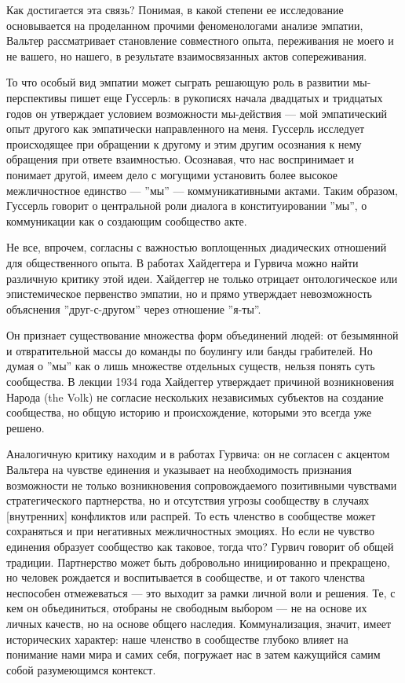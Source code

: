 \documentclass[11pt]{book}
\begin{document}
Как достигается эта связь? Понимая, в какой степени ее исследование основывается на проделанном прочими феноменологами анализе эмпатии, Вальтер рассматривает становление совместного опыта, переживания не моего и не вашего, но нашего, в результате взаимосвязанных актов сопереживания.

То что особый вид эмпатии может сыграть решающую роль в развитии мы-перспективы пишет еще Гуссерль: в рукописях начала двадцатых и тридцатых годов он утверждает условием возможности мы-действия --- мой эмпатический опыт другого как эмпатически направленного на меня. Гуссерль исследует происходящее при обращении к другому и этим другим осознания к нему обращения при ответе взаимностью. Осознавая, что нас воспринимает и понимает другой, имеем дело с могущими установить более высокое межличностное единство --- ''мы'' --- коммуникативными актами. Таким образом, Гуссерль говорит о центральной роли диалога в конституировании ''мы'', о коммуникации как о создающим сообщество акте.

Не все, впрочем, согласны с важностью воплощенных диадических отношений для общественного опыта. В работах Хайдеггера и Гурвича можно найти различную критику этой идеи. Хайдеггер не только отрицает онтологическое или эпистемическое первенство эмпатии, но и прямо утверждает невозможность объяснения ''друг-с-другом'' через отношение ''я-ты''.

Он признает существование множества форм объединений людей: от безымянной и отвратительной массы до команды по боулингу или банды грабителей. Но думая о ''мы'' как о лишь множестве отдельных существ, нельзя понять суть сообщества. В лекции 1934 года Хайдеггер утверждает причиной возникновения Народа (the Volk) не согласие нескольких независимых субъектов на создание сообщества, но общую историю и происхождение, которыми это всегда уже решено.

Аналогичную критику находим и в работах Гурвича: он не согласен с акцентом Вальтера на чувстве единения и указывает на необходимость признания возможности не только возникновения сопровождаемого позитивными чувствами стратегического партнерства, но и отсутствия угрозы сообществу в случаях [внутренних] конфликтов или распрей. То есть членство в сообществе может сохраняться и при негативных межличностных эмоциях. Но если не чувство единения образует сообщество как таковое, тогда что? Гурвич говорит об общей традиции. Партнерство может быть добровольно инициированно и прекращено, но человек рождается и воспитывается в сообществе, и от такого членства неспособен отмежеваться --- это выходит за рамки личной воли и решения. Те, с кем он объединиться, отобраны не свободным выбором --- не на основе их личных качеств, но на основе общего наследия. Коммунализация, значит, имеет исторических характер: наше членство в сообществе глубоко влияет на понимание нами мира и самих себя, погружает нас в затем кажущийся самим собой разумеющимся контекст.
\end{document}
